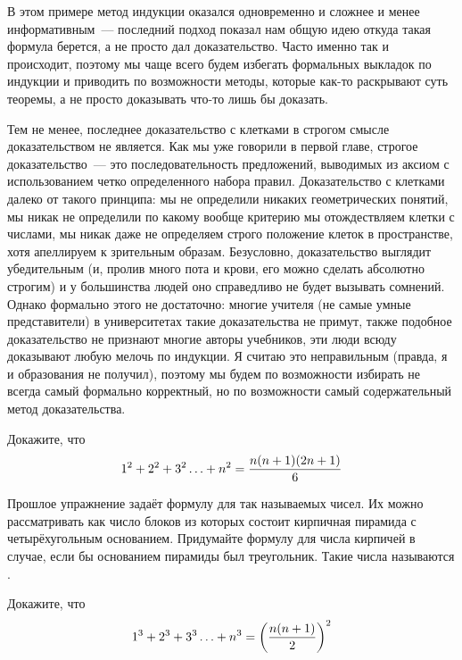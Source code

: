 В этом примере метод индукции оказался одновременно и сложнее и менее информативным~--- последний подход показал нам общую идею откуда такая формула берется, а не просто дал доказательство. Часто именно так и происходит, поэтому мы чаще всего будем избегать формальных выкладок по индукции и приводить по возможности методы, которые как-то раскрывают суть теоремы, а не просто доказывать что-то лишь бы доказать.

Тем не менее, последнее доказательство с клетками в строгом смысле доказательством не является. Как мы уже говорили в первой главе, строгое доказательство~--- это последовательность предложений, выводимых из аксиом с использованием четко определенного набора правил. Доказательство с клетками далеко от такого принципа: мы не определили никаких геометрических понятий, мы никак не определили по какому вообще критерию мы отождествляем клетки с числами, мы никак даже не определяем строго положение клеток в пространстве, хотя апеллируем к зрительным образам. Безусловно, доказательство выглядит убедительным (и, пролив много пота и крови, его можно сделать абсолютно строгим) и у большинства людей оно справедливо не будет вызывать сомнений. Однако формально этого не достаточно: многие учителя (не самые умные представители) в университетах такие доказательства не примут, также подобное доказательство не признают многие авторы учебников, эти люди всюду доказывают любую мелочь по индукции. Я считаю это неправильным (правда, я и образования не получил), поэтому мы будем по возможности избирать не всегда самый формально корректный, но по возможности самый содержательный метод доказательства.

\begin{exercise}
Докажите, что
$$1^2 + 2^2 +3^2 \ldots + n^2 = {n(n+1)(2n+1)\over 6}$$
\end{exercise}

\begin{exercise}
Прошлое упражнение задаёт формулу для так называемых  чисел. Их можно рассматривать как число блоков из которых состоит кирпичная пирамида с четырёхугольным основанием. Придумайте формулу для числа кирпичей в случае, если бы основанием пирамиды был треугольник. Такие числа называются .
\end{exercise}

\begin{exercise}
Докажите, что
$$1^3 + 2^3 +3^3 \ldots + n^3 = \left({n(n+1)\over 2}\right)^2$$
\end{exercise}

